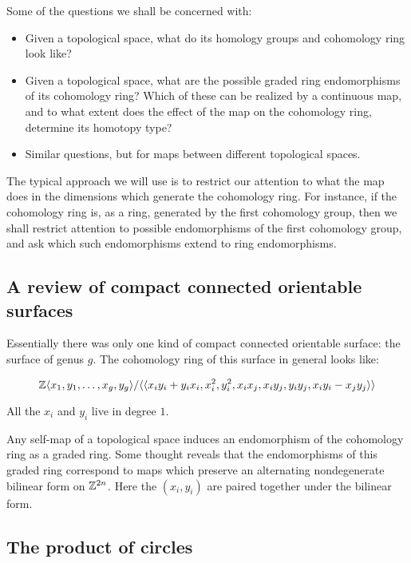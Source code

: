 \documentclass[a4paper]{amsart}
\begin{document}
Some of the questions we shall be concerned with:

\begin{itemize}

\item Given a topological space, what do its homology groups and
  cohomology ring look like?

\item Given a topological space, what are the possible graded ring
  endomorphisms of its cohomology ring? Which of these can be realized
  by a continuous map, and to what extent does the effect of the map
  on the cohomology ring, determine its homotopy type?

\item Similar questions, but for maps between different topological
  spaces.

\end{itemize}

The typical approach we will use is to restrict our attention to what
the map does in the dimensions which generate the cohomology ring. For
instance, if the cohomology ring is, as a ring, generated by the first
cohomology group, then we shall restrict attention to possible
endomorphisms of the first cohomology group, and ask which such
endomorphisms extend to ring endomorphisms.

\subsection{A review of compact connected orientable surfaces}

Essentially there was only one kind of compact connected orientable
surface: the surface of genus $g$. The cohomology ring of this surface
in general looks like:

$$\mathbb{Z} \langle x_1,y_1,\ldots,x_g,y_g \rangle/ \langle \langle x_iy_i + y_ix_i, x_i^2, y_i^2, x_ix_j, x_iy_j, y_iy_j, x_iy_i - x_jy_j \rangle \rangle$$

All the $x_i$ and $y_i$ live in degree $1$.

Any self-map of a topological space induces an endomorphism of the
cohomology ring as a graded ring. Some thought reveals that the
endomorphisms of this graded ring correspond to maps which preserve an
alternating nondegenerate bilinear form on $\mathbb{Z}^{2n}$. Here the
$(x_i,y_i)$ are paired together under the bilinear form.

\subsection{The product of circles}
\end{document}
